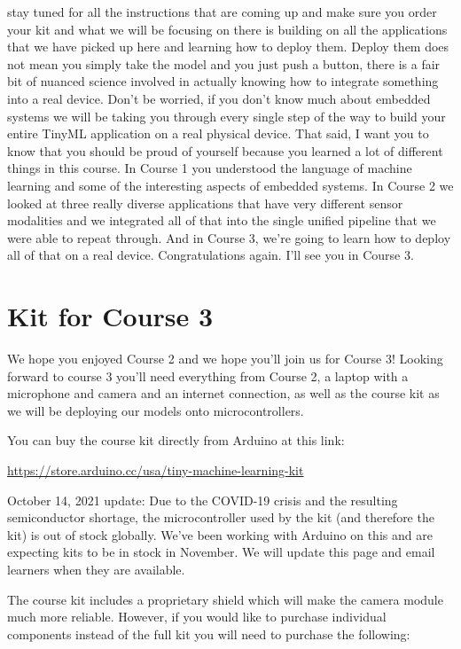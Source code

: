 stay tuned for all the instructions that are coming up
and make sure you order your kit and what
we will be focusing on there is building on all the applications
that we have picked up here and learning how to deploy them.
Deploy them does not mean you simply take the model
and you just push a button, there is a fair bit
of nuanced science involved in actually knowing how to integrate something
into a real device.
Don't be worried, if you don't know much about embedded systems
we will be taking you through every single step of the way
to build your entire TinyML application on a real physical device.
That said, I want you to know that you should be proud of yourself
because you learned a lot of different things in this course.
In Course 1 you understood the language of machine learning
and some of the interesting aspects of embedded systems.
In Course 2 we looked at three really diverse applications that
have very different sensor modalities and we integrated all of that
into the single unified pipeline that we were able to repeat through.
And in Course 3, we're going to learn how
to deploy all of that on a real device.
Congratulations again.
I'll see you in Course 3.
  
\section{Kit for Course 3}

We hope you enjoyed Course 2 and we hope you’ll join us for Course 3!
Looking forward to course 3 you’ll need everything from Course 2, a laptop with a microphone and camera and an internet connection, as well as the course kit as we will be deploying our models onto microcontrollers.

You can buy the course kit directly from Arduino at this link:

\url{https://store.arduino.cc/usa/tiny-machine-learning-kit}

October 14, 2021 update: Due to the COVID-19 crisis and the resulting semiconductor shortage, the microcontroller used by the kit (and therefore the kit) is out of stock globally. We’ve been working with Arduino on this and are expecting kits to be in stock in November. We will update this page and email learners when they are available.

The course kit includes a proprietary shield which will make the camera module much more reliable. However, if you would like to purchase individual components instead of the full kit you will need to purchase the following:

